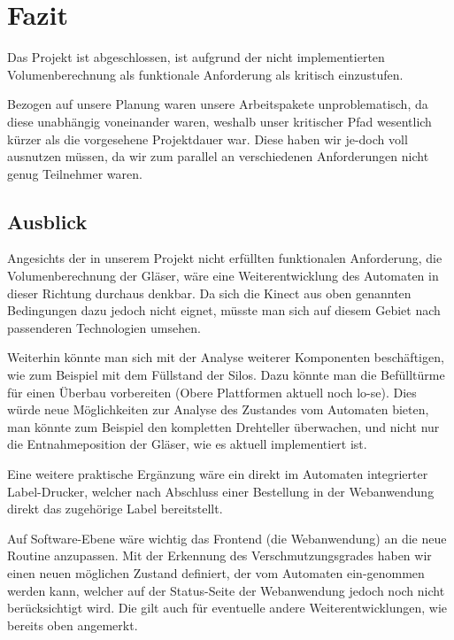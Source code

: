 \chapter{Fazit}
Das Projekt ist abgeschlossen, ist aufgrund der nicht implementierten Volumenberechnung als funktionale Anforderung als kritisch einzustufen.

Bezogen auf unsere Planung waren unsere Arbeitspakete unproblematisch, da diese unabhängig voneinander waren, weshalb unser kritischer Pfad wesentlich kürzer als die vorgesehene Projektdauer war. Diese haben wir je-doch voll ausnutzen müssen, da wir zum parallel an verschiedenen Anforderungen nicht genug Teilnehmer waren.

\section{Ausblick}
Angesichts der in unserem Projekt nicht erfüllten funktionalen Anforderung, die Volumenberechnung der Gläser, wäre eine Weiterentwicklung des Automaten in dieser Richtung durchaus denkbar. Da sich die Kinect aus oben genannten Bedingungen dazu jedoch nicht eignet, müsste man sich auf diesem Gebiet nach passenderen Technologien umsehen.

Weiterhin könnte man sich mit der Analyse weiterer Komponenten beschäftigen, wie zum Beispiel mit dem Füllstand der Silos. Dazu könnte man die Befülltürme für einen Überbau vorbereiten (Obere Plattformen aktuell noch lo-se). Dies würde neue Möglichkeiten zur Analyse des Zustandes vom Automaten bieten, man könnte zum Beispiel den kompletten Drehteller überwachen, und nicht nur die Entnahmeposition der Gläser, wie es aktuell implementiert ist.

Eine weitere praktische Ergänzung wäre ein direkt im Automaten integrierter Label-Drucker, welcher nach Abschluss einer Bestellung in der Webanwendung direkt das zugehörige Label bereitstellt.

Auf Software-Ebene wäre wichtig das Frontend (die Webanwendung) an die neue Routine anzupassen. Mit der Erkennung des Verschmutzungsgrades haben wir einen neuen möglichen Zustand definiert, der vom Automaten ein-genommen werden kann, welcher auf der Status-Seite der Webanwendung jedoch noch nicht berücksichtigt wird. Die gilt auch für eventuelle andere Weiterentwicklungen, wie bereits oben angemerkt.
